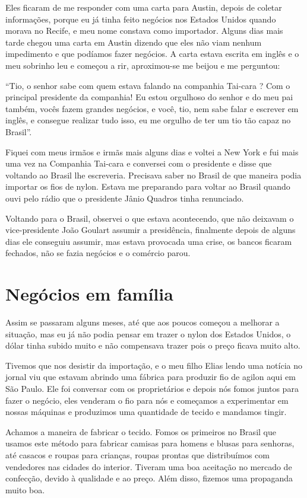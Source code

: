 Eles ficaram de me responder com uma carta para Austin, depois de
coletar informações, porque eu já tinha feito negócios nos Estados
Unidos quando morava no Recife, e meu nome constava como importador.
Alguns dias mais tarde chegou uma carta em Austin dizendo que eles não
viam nenhum impedimento e que podíamos fazer negócios. A carta estava
escrita em inglês e o meu sobrinho leu e começou a rir, aproximou-se me
beijou e me perguntou:

``Tio, o senhor sabe com quem estava falando na companhia Tai-cara ? Com
o principal presidente da companhia! Eu estou orgulhoso do senhor e do
meu pai também, vocês fazem grandes negócios, e você, tio, nem sabe
falar e escrever em inglês, e consegue realizar tudo isso, eu me orgulho
de ter um tio tão capaz no Brasil''.

Fiquei com meus irmãos e irmãs mais alguns dias e voltei a New York e
fui mais uma vez na Companhia Tai-cara e conversei com o presidente e
disse que voltando ao Brasil lhe escreveria. Precisava saber no Brasil
de que maneira podia importar os fios de nylon. Estava me preparando
para voltar ao Brasil quando ouvi pelo rádio que o presidente Jânio
Quadros tinha renunciado.

Voltando para o Brasil, observei o que estava acontecendo, que não
deixavam o vice-presidente João Goulart assumir a presidência,
finalmente depois de alguns dias ele conseguiu assumir, mas estava
provocada uma crise, os bancos ficaram fechados, não se fazia negócios e
o comércio parou.

\chapter{Negócios em família}

Assim se passaram alguns meses, até que aos poucos começou a melhorar a
situação, mas eu já não podia pensar em trazer o nylon dos Estados
Unidos, o dólar tinha subido muito e não compensava trazer pois o preço
ficava muito alto.

Tivemos que nos desistir da importação, e o meu filho Elias lendo uma
notícia no jornal viu que estavam abrindo uma fábrica para produzir fio
de agilon aqui em São Paulo. Ele foi conversar com os proprietários e
depois nós fomos juntos para fazer o negócio, eles venderam o fio para
nós e começamos a experimentar em nossas máquinas e produzimos uma
quantidade de tecido e mandamos tingir.

Achamos a maneira de fabricar o tecido. Fomos os primeiros no Brasil que
usamos este método para fabricar camisas para homens e blusas para
senhoras, até casacos e roupas para crianças, roupas prontas que
distribuímos com vendedores nas cidades do interior. Tiveram uma boa
aceitação no mercado de confecção, devido à qualidade e ao preço. Além
disso, fizemos uma propaganda muito boa.


